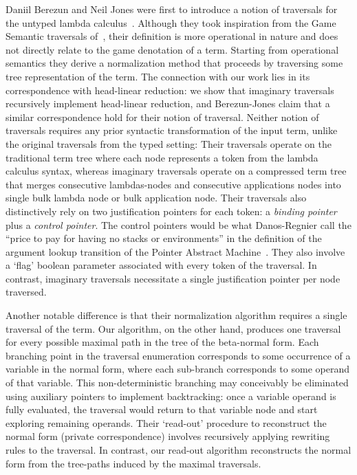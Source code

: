 \documentclass[xchauthor,chkrefs,GCNS,amsmath,amsthm,rotating,leaveRGB]{tcsg}
\theoremstyle{plain}
\theoremstyle{definition}
\begin{document}
Daniil Berezun and Neil Jones were first to introduce a notion of traversals
for the untyped lambda calculus~\cite{JonesBerezunLLL-PEPM17}. Although they
took inspiration from the Game Semantic traversals
of~\cite{OngLics2006,BlumGalop2008}, their definition is more operational in
nature and does not directly relate to the game denotation of a term.
Starting from operational semantics they derive a normalization method that
proceeds by traversing some tree representation of the term. The connection
with our work lies in its correspondence with head-linear reduction: we show
that imaginary traversals recursively implement head-linear reduction, and
Berezun-Jones claim that a similar correspondence hold for their notion of
traversal. Neither notion of traversals requires any prior syntactic
transformation of the input term, unlike the original traversals from the
typed setting: Their traversals operate on the traditional term tree where
each node represents a token from the lambda calculus syntax, whereas
imaginary traversals operate on a compressed term tree that merges
consecutive lambdas-nodes and consecutive applications nodes into single bulk
lambda node or bulk application node. Their traversals also distinctively
rely on two justification pointers for each token: a \emph{binding pointer}
plus a \emph{control pointer}. The control pointers would be what
Danos-Regnier call the ``price to pay for having no stacks or environments''
in the definition of the argument lookup transition of the Pointer Abstract
Machine~\cite{danos-head}. They also involve a `flag' boolean parameter
associated with every token of the traversal. In contrast, imaginary
traversals necessitate a single justification pointer per node traversed.

Another notable difference is that their normalization algorithm requires a
single traversal of the term. Our algorithm, on the other hand, produces one
traversal for every possible maximal path in the tree of the beta-normal
form. Each branching point in the traversal enumeration corresponds to some
occurrence of a variable in the normal form, where each sub-branch
corresponds to some operand of that variable. This non-deterministic
branching may conceivably be eliminated using auxiliary pointers to implement
backtracking: once a variable operand is fully evaluated, the traversal would
return to that variable node and start exploring remaining operands. Their
`read-out' procedure to reconstruct the normal form (private correspondence)
involves recursively applying rewriting rules to the traversal. In contrast,
our read-out algorithm reconstructs the normal form from the tree-paths
induced by the maximal traversals.
\end{document}
